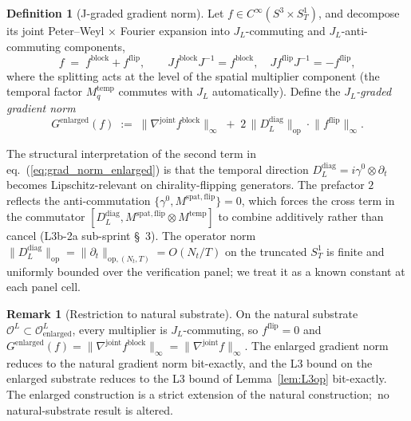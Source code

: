 \documentclass[11pt,a4paper]{article}
\theoremstyle{plain}
\theoremstyle{definition}
\newtheorem{definition}[theorem]{Definition}
\newtheorem{remark}[theorem]{Remark}
\newcommand{\Nt}{N_{t}}
\newcommand{\Sone}{S^{1}}
\newcommand{\Manifold}{S^{3}\times S^{1}_{T}}
\newcommand{\Op}{\mathcal{O}}
\newcommand{\opnorm}[1]{\lVert #1 \rVert_{\mathrm{op}}}
\newcommand{\norm}[1]{\lVert #1 \rVert}
\newcommand{\Ddiag}{D_{L}^{\mathrm{diag}}}
\newcommand{\JL}{J_{L}}
\newcommand{\spat}{\mathrm{spat}}
\newcommand{\temp}{\mathrm{temp}}
\begin{document}
\begin{definition}[J-graded gradient norm]\label{def:enlarged_grad_norm}
Let $f \in C^{\infty}(\Manifold)$, and decompose its joint
Peter--Weyl $\times$ Fourier expansion into $\JL$-commuting and
$\JL$-anti-commuting components,
\begin{equation}\label{eq:f_split_J}
   f \;=\; f^{\mathrm{block}} + f^{\mathrm{flip}},
   \qquad J f^{\mathrm{block}} J^{-1} = f^{\mathrm{block}},
   \quad J f^{\mathrm{flip}} J^{-1} = -f^{\mathrm{flip}},
\end{equation}
where the splitting acts at the level of the spatial multiplier
component (the temporal factor $M^{\temp}_{q}$ commutes with $\JL$
automatically). Define the \emph{$\JL$-graded gradient norm}
\begin{equation}\label{eq:grad_norm_enlarged}
   G^{\mathrm{enlarged}}(f)
   \;:=\; \norm{\nabla^{\mathrm{joint}} f^{\mathrm{block}}}_{\infty}
   \;+\; 2\,\opnorm{\Ddiag} \cdot \norm{f^{\mathrm{flip}}}_{\infty}.
\end{equation}
\end{definition}

The structural interpretation of the second term in
eq.~(\ref{eq:grad_norm_enlarged}) is that the temporal direction
$\Ddiag = i \gamma^{0} \otimes \partial_{t}$ becomes Lipschitz-relevant
on chirality-flipping generators. The prefactor $2$ reflects the
anti-commutation $\{\gamma^{0}, M^{\spat,\mathrm{flip}}\} = 0$, which
forces the cross term in the commutator $[\Ddiag, M^{\spat,\mathrm{flip}}
\otimes M^{\temp}]$ to combine additively rather than cancel
(L3b-2a sub-sprint \S~3). The operator norm
$\opnorm{\Ddiag} = \lVert \partial_{t} \rVert_{\mathrm{op}, (\Nt, T)} = O(\Nt / T)$
on the truncated $\Sone_{T}$ is finite and uniformly bounded over the
verification panel; we treat it as a known constant at each panel cell.

\begin{remark}[Restriction to natural substrate]
\label{rem:graded_norm_natural}
On the natural substrate $\Op^{L} \subset \Op^{L}_{\mathrm{enlarged}}$,
every multiplier is $\JL$-commuting, so $f^{\mathrm{flip}} = 0$ and
$G^{\mathrm{enlarged}}(f) = \norm{\nabla^{\mathrm{joint}} f^{\mathrm{block}}}_{\infty}
= \norm{\nabla^{\mathrm{joint}} f}_{\infty}$. The enlarged gradient
norm reduces to the natural gradient norm bit-exactly, and the L3
bound on the enlarged substrate reduces to the L3 bound of
Lemma~\ref{lem:L3op} bit-exactly. The enlarged construction is a
strict extension of the natural construction;\ no natural-substrate
result is altered.
\end{remark}
\end{document}
